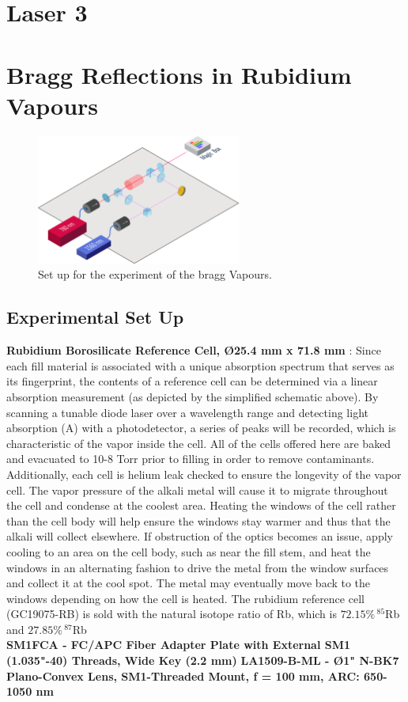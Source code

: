 \documentclass[10pt]{article}
\begin{document}
\section*{Laser 3}


\section*{Bragg Reflections in Rubidium Vapours}

\begin{figure}
    \centering
    \includegraphics[width=0.6\textwidth]{img/path16176.png}
    \caption{Set up for the experiment of the bragg Vapours.}
    \label{fig:braggref1}
\end{figure}






\subsection*{Experimental Set Up}
\textbf{Rubidium Borosilicate Reference Cell, Ø25.4 mm x 71.8 mm } :
Since each fill material is associated with a unique absorption spectrum that serves as its fingerprint, the contents of a reference cell can be determined via a linear absorption measurement (as depicted by the simplified schematic above). By scanning a tunable diode laser over a wavelength range and detecting light absorption (A) with a photodetector, a series of peaks will be recorded, which is characteristic of the vapor inside the cell.
All of the cells offered here are baked and evacuated to 10-8 Torr prior to filling in order to remove contaminants. Additionally, each cell is helium leak checked to ensure the longevity of the vapor cell. The vapor pressure of the alkali metal will cause it to migrate throughout the cell and condense at the coolest area. Heating the windows of the cell rather than the cell body will help ensure the windows stay warmer and thus that the alkali will collect elsewhere. If obstruction of the optics becomes an issue, apply cooling to an area on the cell body, such as near the fill stem, and heat the windows in an alternating fashion to drive the metal from the window surfaces and collect it at the cool spot. The metal may eventually move back to the windows depending on how the cell is heated.
The rubidium reference cell (GC19075-RB) is sold with the natural isotope ratio of Rb, which is $72.15\% \, ^{85}$Rb and $27.85\% \, ^{87}$Rb  \\
\textbf{SM1FCA - FC/APC Fiber Adapter Plate with External SM1 (1.035"-40) Threads, Wide Key (2.2 mm)}
\textbf{LA1509-B-ML - Ø1" N-BK7 Plano-Convex Lens, SM1-Threaded Mount, f = 100 mm, ARC: 650-1050 nm }
\end{document}
